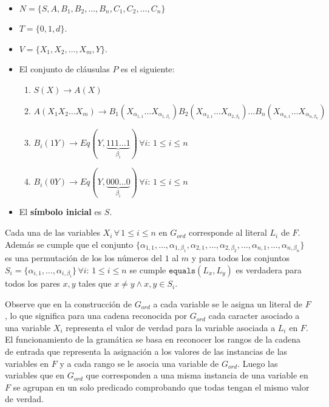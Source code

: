 \documentclass[12pt]{article}
\begin{document}
\begin{itemize}
    \item $N=\{S,A,B_1,B_2,\ldots,B_n,C_1,C_2,\ldots,C_n\}$
    \item $T=\{0,1,d\}$.
    \item $V=\{X_1,X_2,\ldots,X_m,Y\}$.
    \item El conjunto de cláusulas $P$ es el siguiente:
          \begin{enumerate}
              \item  $S(X)\to A(X)$
              \item $A(X_1X_2\ldots X_m)\to
                        B_1(X_{\alpha_{1,1}}\ldots X_{\alpha_{1,\beta_1}})
                        B_2(X_{\alpha_{2,1}}\ldots X_{\alpha_{2,\beta_2}})
                        \ldots B_n(X_{\alpha_{n,1}}\ldots X_{\alpha_{n,\beta_n}})$
              \item $B_i(1Y)\to  Eq(Y,\underbrace{111\ldots 1}_{\beta_i})\,\forall i: \,1\leq i\leq n$

              \item $B_i(0Y)\to  Eq(Y,\underbrace{000\ldots 0}_{\beta_i})\,\forall i:\,1\leq i\leq n$
          \end{enumerate}
    \item El \textbf{símbolo inicial} es $S$.
\end{itemize}

Cada una de las variables $X_i\,\forall\,1\leq i\leq n$ en $G_{ord}$ corresponde al literal $L_i$ de $F$.
Además se cumple que el conjunto $\{\alpha_{1,1},\ldots,\alpha_{1,\beta_1},\alpha_{2,1},\ldots,
    \alpha_{2,\beta_2},\ldots,\alpha_{n,1},\ldots,\alpha_{n,\beta_n}\}$ es una permutación de los los números del
$1$ al $m$ y para todos los conjuntos $S_i=\{\alpha_{i,1},\ldots,\alpha_{i,\beta_i}\}\,\forall i:\,1\leq i\leq n$ se cumple
$\texttt{equals}(L_x,L_y)$ es verdadera para todos los pares $x, y$ tales que $x\neq y \wedge x,y\in S_i$.

Observe que en la construcción de $G_{ord}$ a cada variable se le asigna un literal de $F$, lo que significa
para una cadena reconocida por $G_{ord}$ cada caracter asociado a una variable $X_i$ representa el valor de verdad
para la variable asociada a $L_i$ en $F$. El funcionamiento de la gramática se basa en reconocer los rangos de la cadena
de entrada que representa la asignación a los valores de las instancias de las variables en $F$ y a cada rango se le asocia
una variable de $G_{ord}$. Luego las variables que en $G_{ord}$ que corresponden a una misma instancia de una variable en
$F$ se agrupan en un solo predicado comprobando que todas tengan el mismo valor de verdad.
\end{document}
